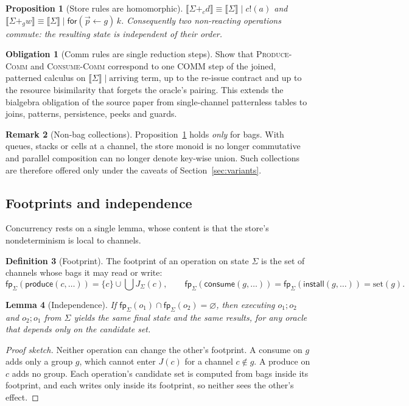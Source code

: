 \documentclass[11pt]{article}
\theoremstyle{plain}
\newtheorem{proposition}{Proposition}[section]
\newtheorem{lemma}[proposition]{Lemma}
\theoremstyle{definition}
\newtheorem{definition}[proposition]{Definition}
\newtheorem{remark}[proposition]{Remark}
\newtheorem{obligation}{Obligation}
\newcommand{\fp}{\mathsf{fp}}
\begin{document}
\begin{proposition}[Store rules are homomorphic]\label{prop:hom}
$\llbracket\Sigma+_c d\rrbracket\equiv\llbracket\Sigma\rrbracket\mid c!(a)$ and
$\llbracket\Sigma+_g w\rrbracket\equiv\llbracket\Sigma\rrbracket\mid
\mathsf{for}(\vec p\leftarrow g)\,k$. Consequently two non-reacting operations
commute: the resulting state is independent of their order.
\end{proposition}

\begin{obligation}[Comm rules are single reduction steps]\label{ob:comm}
Show that \textsc{Produce-Comm} and \textsc{Consume-Comm} correspond to one COMM
step of the joined, patterned calculus on
$\llbracket\Sigma\rrbracket\mid\text{arriving term}$, up to the re-issue contract
and up to the resource bisimilarity that forgets the oracle's pairing. This extends
the bialgebra obligation of the source paper from single-channel patternless
tables to joins, patterns, persistence, peeks and guards.
\end{obligation}

\begin{remark}[Non-bag collections]\label{rem:nonbag}
Proposition~\ref{prop:hom} holds \emph{only} for bags. With queues, stacks or cells
at a channel, the store monoid is no longer commutative and parallel composition can
no longer denote key-wise union. Such collections are therefore offered only
under the caveats of Section~\ref{sec:variants}.
\end{remark}

\subsection{Footprints and independence}\label{sec:footprint}

Concurrency rests on a single lemma, whose content is that the store's
nondeterminism is local to channels.

\begin{definition}[Footprint]
The footprint of an operation on state $\Sigma$ is the set of channels whose bags it
may read or write:
\[
  \fp_\Sigma(\mathsf{produce}(c,\dots)) = \{c\}\cup\textstyle\bigcup J_\Sigma(c),
  \qquad
  \fp_\Sigma(\mathsf{consume}(g,\dots)) = \fp_\Sigma(\mathsf{install}(g,\dots)) = \mathrm{set}(g).
\]
\end{definition}

\begin{lemma}[Independence]\label{lem:indep}
If $\fp_\Sigma(o_1)\cap\fp_\Sigma(o_2)=\varnothing$, then executing $o_1;o_2$ and
$o_2;o_1$ from $\Sigma$ yields the same final state and the same results, for any
oracle that depends only on the candidate set.
\end{lemma}
\begin{proof}[Proof sketch]
Neither operation can change the other's footprint. A consume on $g$ adds only a
group $g$, which cannot enter $J(c)$ for a channel $c\notin g$. A produce on $c$
adds no group. Each operation's candidate set is computed from bags inside its
footprint, and each writes only inside its footprint, so neither sees the other's
effect.
\end{proof}
\end{document}
